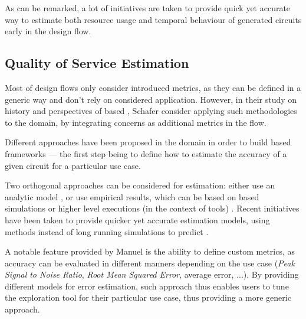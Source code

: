             As can be remarked, a lot of initiatives are taken to provide quick yet accurate way to estimate both resource usage and temporal behaviour of generated circuits early in the design flow.

    \subsection{Quality of Service Estimation}
    \label{ch.state:sec.metric:ssec.qos}
        Most of design flows only consider introduced metrics, as they can be defined in a generic way and don't rely on considered application.
        However, in their study on history and perspectives of  based , Schafer \etal{} \cite{schafer_high-level_2020} consider applying such methodologies to the  domain, by integrating  concerns as additional metrics in the flow.
        
        Different approaches have been proposed in the  domain in order to build  based  frameworks --- the first step being to define how to estimate the accuracy of a given circuit for a particular use case.

        Two orthogonal approaches can be considered for  estimation: either use an analytic model \cite{herve_data_2005}, or use empirical results, which can be based on  based simulations \cite{manuel_model-based_2020} or higher level executions (\eg in the context of  tools) \cite{rehman_architectural-space_2016}\cite{gao_automatically_2016}.
        Recent initiatives have been taken to provide quicker yet accurate estimation models, using  methods instead of long running simulations to predict  \cite{awais_ldax_2021}.

        A notable feature provided by Manuel \etal{} \cite{manuel_model-based_2020} is the ability to define custom  metrics, as accuracy can be evaluated in different manners depending on the use case ({\it Peak Signal to Noise Ratio}, {\it Root Mean Squared Error}, average error, ...).
        By providing different models for error estimation, such approach thus enables users to tune the exploration tool for their particular use case, thus providing a more generic approach.

